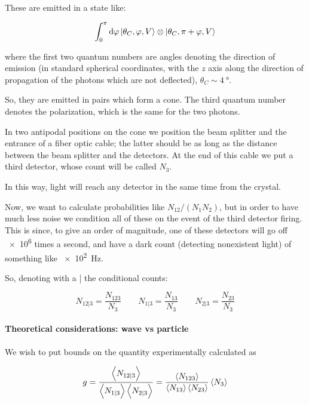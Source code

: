 \documentclass[main.tex]{subfiles}
\begin{document}
These are emitted in a state like:

\begin{equation}
    \int _0^{\pi}  \dd{\varphi} \ket{\theta_C, \varphi, V} \otimes \ket{\theta_C, \pi +  \varphi, V}
\end{equation}

where the first two quantum numbers are angles denoting the direction of emission (in standard spherical coordinates, with the \(z\) axis along the direction of propagation of the photons which are not deflected), \(\theta_C \sim \SI{4}{\degree} \).

So, they are emitted in pairs which form a cone. The third quantum number denotes the polarization, which is the same for the two photons.

In two antipodal positions on the cone we position the beam splitter and the entrance of a fiber optic cable; the latter should be as long as the distance between the beam splitter and the detectors. At the end of this cable we put a third detector, whose count will be called \(N_3\).

In this way, light will reach any detector in the same time from the crystal.

Now, we want to calculate probabilities like \(N_{12} / (N_1 N_2)\), but in order to have much less noise we condition all of these on the event of the third detector firing. This is since, to give an order of magnitude, one of these detectors will go off \SI{e6}{} times a second, and have a dark count (detecting nonexistent light) of something like \SI{e2}{Hz}.

So, denoting with a | the conditional counts:

\begin{equation}
    N_{12|3} = \frac{N_{123}}{N_3}
    \qquad
    N_{1|3} = \frac{N_{13}}{N_3}
    \qquad
    N_{2|3} = \frac{N_{23}}{N_3}
\end{equation}

\paragraph{Theoretical considerations: wave vs particle}

We wish to put bounds on the quantity experimentally calculated as

\begin{equation}
    g = \frac{\expval{N_{12|3}} }{\expval{N_{1|3}} \expval{N_{2|3}}}
    = \frac{\expval{N_{123}} }{\expval{N_{13}} \expval{N_{23}}} \expval{N_3}
\end{equation}
\end{document}
